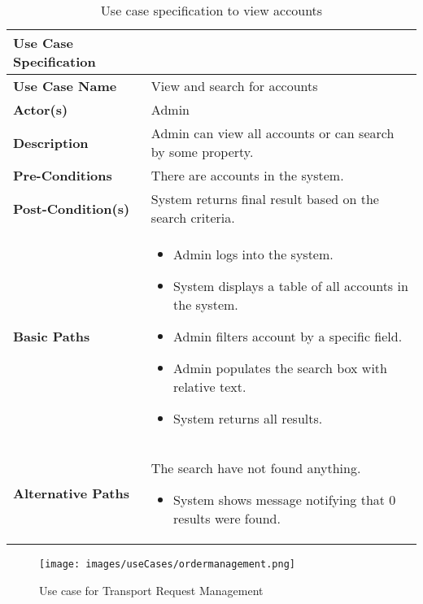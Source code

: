 \documentclass[a4paper]{article}
\begin{document}
    
      \begin{longtable}{|p{}|p{}|}
         \caption{Use case specification to view accounts}
        \label{viewAccountsUseCase} \\
        \hline
        Use Case Specification  &  \\
         \hline
        \endhead
         \textbf{Use Case Name} & View and search for accounts\\
         \hline
         \textbf{Actor(s)} & Admin \\
         \hline
         \textbf{Description} & Admin can view all accounts or can search by some property. \\
         \hline
         \textbf{Pre-Conditions} & There are accounts in the system. \\
         \hline
        \textbf{Post-Condition(s)} & System returns final result based on the search criteria. \\
         \hline
         \textbf{Basic Paths} & 
         \begin{itemize}
             \item Admin logs into the system.
             \item System displays a table of all accounts in the system.
             \item Admin filters account by a specific field.
             \item Admin populates the search box with relative text.
             \item System returns all results.
         \end{itemize} 
       \\
         
      \hline
    \textbf{Alternative Paths} & The search have not found anything.
        \begin{itemize}
            \item System shows message notifying that 0 results were found.
        \end{itemize} \\
        \hline
    \end{longtable}
    
    
     \begin{figure}[H]
     \centering
     \texttt{[image: images/useCases/ordermanagement.png]}
     \caption{Use case for Transport Request Management}
     \label{transportrequestManagementUseCase}
    \end{figure}
    
\end{document}
